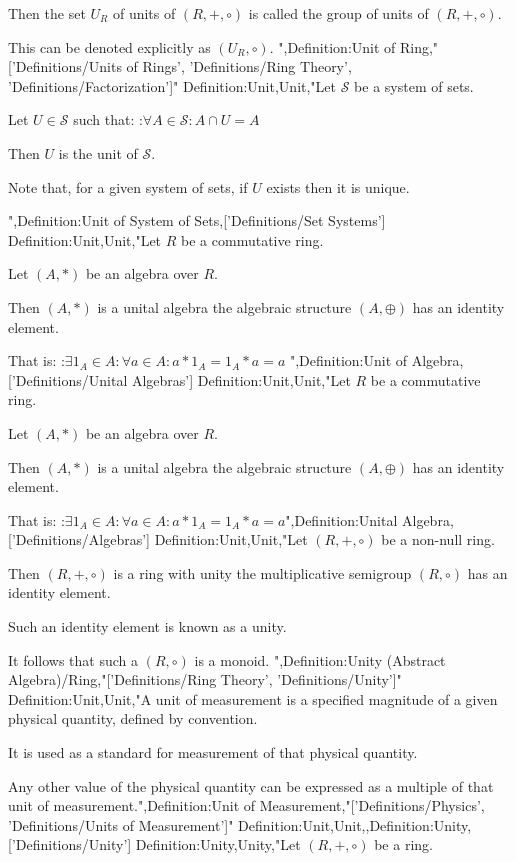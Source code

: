 Then the set $U_R$ of units of $\left( R, +, \circ \right)$ is called the group of units of $\left( R, +, \circ \right)$.


This can be denoted explicitly as $\left( U_R, \circ \right)$.
",Definition:Unit of Ring,"['Definitions/Units of Rings', 'Definitions/Ring Theory', 'Definitions/Factorization']"
Definition:Unit,Unit,"Let $\mathcal S$ be a system of sets.

Let $U \in \mathcal S$ such that:
:$\forall A \in \mathcal S: A \cap U = A$


Then $U$ is the unit of $\mathcal S$.


Note that, for a given system of sets, if $U$ exists then it is unique.

",Definition:Unit of System of Sets,['Definitions/Set Systems']
Definition:Unit,Unit,"Let $R$ be a commutative ring.

Let $\left( A, * \right)$ be an algebra over $R$. 


Then $\left( A, * \right)$ is a unital algebra  the algebraic structure $\left( A, \oplus \right)$ has an identity element.

That is:
:$\exists 1_A \in A: \forall a \in A: a * 1_A = 1_A * a = a$
",Definition:Unit of Algebra,['Definitions/Unital Algebras']
Definition:Unit,Unit,"Let $R$ be a commutative ring.

Let $\left( A, * \right)$ be an algebra over $R$. 


Then $\left( A, * \right)$ is a unital algebra  the algebraic structure $\left( A, \oplus \right)$ has an identity element.

That is:
:$\exists 1_A \in A: \forall a \in A: a * 1_A = 1_A * a = a$",Definition:Unital Algebra,['Definitions/Algebras']
Definition:Unit,Unit,"Let $\left( R, +, \circ \right)$ be a non-null ring.

Then $\left( R, +, \circ \right)$ is a ring with unity  the multiplicative semigroup $\left( R, \circ \right)$ has an identity element.

Such an identity element is known as a unity.


It follows that such a $\left( R, \circ \right)$ is a monoid.
",Definition:Unity (Abstract Algebra)/Ring,"['Definitions/Ring Theory', 'Definitions/Unity']"
Definition:Unit,Unit,"A unit of measurement is a specified magnitude of a given physical quantity, defined by convention.

It is used as a standard for measurement of that physical quantity.

Any other value of the physical quantity can be expressed as a multiple of that unit of measurement.",Definition:Unit of Measurement,"['Definitions/Physics', 'Definitions/Units of Measurement']"
Definition:Unit,Unit,,Definition:Unity,['Definitions/Unity']
Definition:Unity,Unity,"Let $\left( R, +, \circ \right)$ be a ring.

